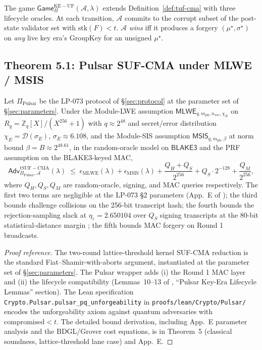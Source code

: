 \begin{definition}
\label{def:keyera-uf}
The game $\mathsf{Game}^{\mathrm{KE-UF}}_{\Pi}(\mathcal{A}, \lambda)$
extends Definition~\ref{def:tuf-cma} with three lifecycle oracles. At
each transition, $\mathcal{A}$ commits to the corrupt subset of the
post-state validator set with $\mathrm{stk}(F) < t$. $\mathcal{A}$
\emph{wins} iff it produces a forgery $(\mu^\star, \sigma^\star)$ on
\emph{any} live key era's GroupKey for an unsigned $\mu^\star$.
\end{definition}

\subsection{Theorem 5.1: Pulsar SUF-CMA under MLWE / MSIS}
\label{sec:security:thm51}

\begin{theorem}
\label{thm:pulsar-suf-cma}
Let $\Pi_{\mathrm{Pulsar}}$ be the LP-073 protocol of
\S\ref{sec:protocol} at the parameter set of \S\ref{sec:parameters}.
Under the Module-LWE assumption
$\mathsf{MLWE}_{q, m_{\mathrm{pk}}, n_{\mathrm{vec}}, \chi_E}$ on
$R_q = \mathbb{Z}_q[X]/(X^{256}+1)$ with $q \approx 2^{48}$ and
secret/error distribution $\chi_E = \mathcal{D}(\sigma_E)$,
$\sigma_E \approx 6.108$, and the Module-SIS assumption
$\mathsf{MSIS}_{q, m_{\mathrm{pk}}, \beta}$ at norm bound
$\beta = B \approx 2^{48.61}$, in the random-oracle model on
$\mathsf{BLAKE3}$ and the PRF assumption on the BLAKE3-keyed MAC,
\[
  \mathsf{Adv}^{\mathrm{tSUF-CMA}}_{\Pi_{\mathrm{Pulsar}}, \mathcal{A}}(\lambda)
  \;\leq\;
  \epsilon_{\mathrm{MLWE}}(\lambda)
  + \epsilon_{\mathrm{MSIS}}(\lambda)
  + \frac{Q_H + Q_S}{2^{256}}
  + Q_S \cdot 2^{-128}
  + \frac{Q_M}{2^{256}},
\]
where $Q_H, Q_S, Q_M$ are random-oracle, signing, and MAC queries
respectively. The first two terms are negligible at the LP-073 \S2
parameters (App.~E of \cite{quasarcertsoundness}); the third bounds
challenge collisions on the 256-bit transcript hash; the fourth bounds
the rejection-sampling slack at $\eta_\varepsilon = 2.650104$ over
$Q_S$ signing transcripts at the $80$-bit statistical-distance margin
\cite{dilithium}; the fifth bounds MAC forgery on Round 1 broadcasts.
\end{theorem}

\begin{proof}[Proof reference]
The two-round lattice-threshold kernel SUF-CMA reduction is the standard
Fiat--Shamir-with-aborts argument, instantiated at the parameter set of
\S\ref{sec:parameters}. The Pulsar wrapper adds (i) the Round 1 MAC layer
and (ii) the lifecycle compatibility (Lemmas~10--13 of
\cite{quasarcertsoundness}, ``Pulsar Key-Era Lifecycle Lemmas''
section). The Lean specification
\texttt{Crypto.Pulsar.pulsar\_pq\_unforgeability} in
\texttt{proofs/lean/Crypto/Pulsar/} \cite{leancrypto} encodes the
unforgeability axiom against quantum adversaries with $\mathrm{compromised}
< t$. The detailed bound derivation, including App.~E parameter analysis
and the BDGL/Grover cost equations, is in \cite{quasarcertsoundness}
Theorem~5 (classical soundness, lattice-threshold lane case) and App.~E.
\end{proof}


